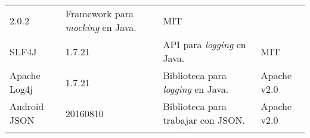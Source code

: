 \begin{longtable}[]{@{}llll@{}}
\begin{minipage}[t]{0.08\columnwidth}
2.0.2\strut
\end{minipage} & \begin{minipage}[t]{0.49\columnwidth}\raggedright\strut
Framework para \emph{mocking} en Java.\strut
\end{minipage} & \begin{minipage}[t]{0.11\columnwidth}\raggedright\strut
MIT\strut
\end{minipage}\tabularnewline
\begin{minipage}[t]{0.18\columnwidth}\raggedright\strut
SLF4J\strut
\end{minipage} & \begin{minipage}[t]{0.08\columnwidth}\raggedright\strut
1.7.21\strut
\end{minipage} & \begin{minipage}[t]{0.49\columnwidth}\raggedright\strut
API para \emph{logging} en Java.\strut
\end{minipage} & \begin{minipage}[t]{0.11\columnwidth}\raggedright\strut
MIT\strut
\end{minipage}\tabularnewline
\begin{minipage}[t]{0.18\columnwidth}\raggedright\strut
Apache Log4j\strut
\end{minipage} & \begin{minipage}[t]{0.08\columnwidth}\raggedright\strut
1.7.21\strut
\end{minipage} & \begin{minipage}[t]{0.49\columnwidth}\raggedright\strut
Biblioteca para \emph{logging} en Java.\strut
\end{minipage} & \begin{minipage}[t]{0.11\columnwidth}\raggedright\strut
Apache v2.0\strut
\end{minipage}\tabularnewline
\begin{minipage}[t]{0.18\columnwidth}\raggedright\strut
Android JSON\strut
\end{minipage} & \begin{minipage}[t]{0.08\columnwidth}\raggedright\strut
20160810\strut
\end{minipage} & \begin{minipage}[t]{0.49\columnwidth}\raggedright\strut
Biblioteca para trabajar con JSON.\strut
\end{minipage} & \begin{minipage}[t]{0.11\columnwidth}\raggedright\strut
Apache v2.0\strut
\end{minipage}\tabularnewline
\begin{minipage}[t]{0.18\columnwidth}\raggedright\strut

\end{minipage}
\end{longtable}
